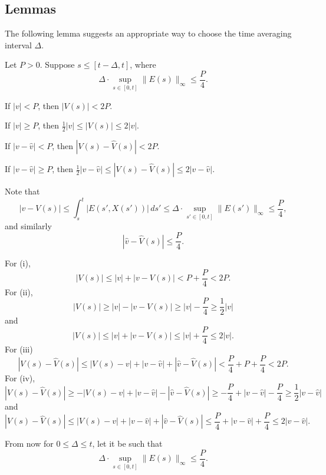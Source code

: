 \documentclass[11pt]{amsart}
\begin{document}
\subsection{Lemmas}
The following lemma suggests an appropriate way to choose the time averaging interval $\Delta$.
\begin{lem}
Let $P>0$.
Suppose $s\le[t-\Delta,t]$, where
\[\Delta\cdot\sup_{s\in[0,t]}\|E(s)\|_\infty\le\frac P4.\]
\begin{ol}
\item If $|v|<P$, then $|V(s)|<2P$.
\item If $|v|\ge P$, then $\frac12|v|\le|V(s)|\le2|v|$. 
\item If $|v-\hat v|<P$, then $|V(s)-\hat V(s)|<2P$.
\item If $|v-\hat v|\ge P$, then $\frac12|v-\hat v|\le|V(s)-\hat V(s)|\le2|v-\hat v|$.
\end{ol}
\end{lem}
\begin{pf}
Note that
\[|v-V(s)|\le\int_s^t|E(s',X(s'))|\,ds'\le\Delta\cdot\sup_{s'\in[0,t]}\|E(s')\|_\infty\le\frac P4,\]
and similarly
\[|\hat v-\hat V(s)|\le\frac P4.\]

For (i),
\[|V(s)|\le|v|+|v-V(s)|<P+\frac P4<2P.\]
For (ii),
\[|V(s)|\ge|v|-|v-V(s)|\ge|v|-\frac P4\ge\frac12|v|\]
and
\[|V(s)|\le|v|+|v-V(s)|\le|v|+\frac P4\le2|v|.\]
For (iii)
\[|V(s)-\hat V(s)|\le|V(s)-v|+|v-\hat v|+|\hat v-\hat V(s)|<\frac P4+P+\frac P4<2P.\]
For (iv),
\[|V(s)-\hat V(s)|\ge-|V(s)-v|+|v-\hat v|-|\hat v-\hat V(s)|\ge-\frac P4+|v-\hat v|-\frac P4\ge\frac12|v-\hat v|\]
and
\[|V(s)-\hat V(s)|\le|V(s)-v|+|v-\hat v|+|\hat v-\hat V(s)|\le\frac P4+|v-\hat v|+\frac P4\le2|v-\hat v|.\]
\end{pf}


From now for $0\le\Delta\le t$, let it be such that
\[\Delta\cdot\sup_{s\in[0,t]}\|E(s)\|_\infty\le\frac P4.\]
\end{document}
